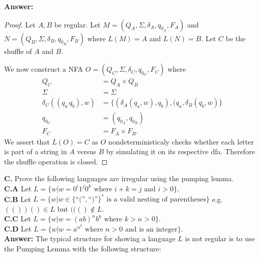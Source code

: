 \documentclass[10pt]{article}
\begin{document}
\noindent
\textbf{Answer:}

\begin{proof}
    Let $A,B$ be regular. Let $M = (Q_A,\Sigma,\delta_A,q_{0_A}, F_A)$ and $N = (Q_B,\Sigma,\delta_B,q_{0_B}, F_B)$ where $L(M)=A$ and $L(N)=B.$ Let $C$ be the shuffle of $A$ and $B.$

    We now construct a NFA $O = (Q_C,\Sigma,\delta_C,q_{0_C}, F_C)$ where
    \begin{align*}
        Q_C &= Q_A \times Q_B \\
        \Sigma &= \Sigma\\
        \delta_C((q_a\, q_b),w)&= \{ (\delta_A(q_a, w), q_b), (q_a, \delta_B(q_b, w)\}
\\%
        q_{0_C} &= (q_{0_A}, q_{0_B})\\
        F_C &= F_A\times F_B.%
    \end{align*}
    We assert that $L(O)=C$ as $O$ nondeterministicaly checks whether each letter is part of a string in $A$ versus $B$ by simulating it on its respective dfa. Therefore the shuffle operation is closed.
\end{proof}

\newpage

\noindent
\textbf{C.} Prove the following languages are irregular using the pumping lemma.\\
\textbf{C.A} Let $L=\{w|w=0^i1^j0^k \text{ where } i+k=j \text{ and }i>0\}.$\\
\textbf{C.B} Let $L=\{w|w\in\{\text{``(''}, \text{``)''}\}^* \text{ is a valid nesting of parentheses}\}$ e.g. $(())()\in L$ but $((()\notin L.$\\
\textbf{C.C} Let $L=\{w|w=(ab)^nb^k \text{ where }k>n>0\}$.\\
\textbf{C.D} Let $L=\{w|w=a^{n^3} \text{ where }n>0 \text{ and is an integer}\}$.\\


\noindent
\textbf{Answer:}
The typical structure for showing a language $L$ is not regular is to use the Pumping Lemma with the following structure:
\end{document}
